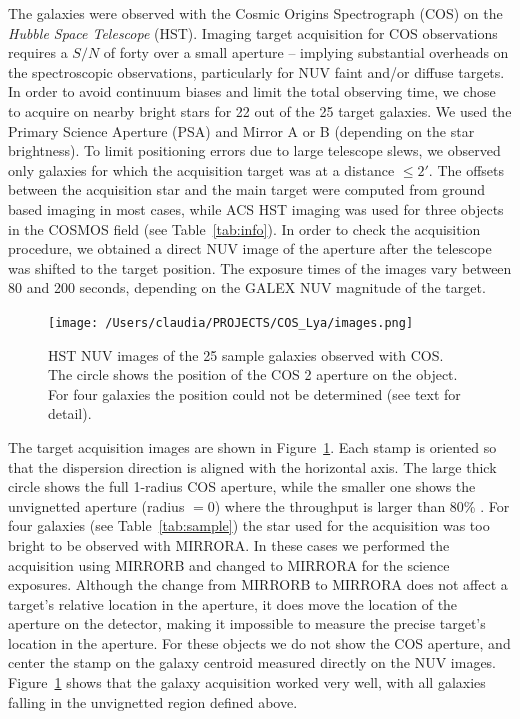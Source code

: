 \documentclass[manuscript]{emulateapj}
\begin{document}
The galaxies were observed  with the  Cosmic Origins Spectrograph (COS) on 
the {\it Hubble Space Telescope} (HST).  Imaging target acquisition for COS observations requires a 
$S/N$ of forty over a small aperture -- implying substantial overheads on the spectroscopic observations, 
particularly for NUV faint and/or diffuse targets.  
In order to avoid continuum biases and limit the total observing time, we chose to acquire on nearby bright stars for 22 out of the 25 target galaxies. We used the Primary Science Aperture (PSA)  and Mirror A or B (depending on the star brightness). 
To limit positioning errors due to large  telescope slews,  we observed only galaxies for which the acquisition target was at a distance $\le 2'$.  The offsets between the acquisition star and the main target were computed from  ground based imaging in most cases, while ACS HST imaging was used for three  objects in the
COSMOS field (see Table~\ref{tab:info}). In order to check the acquisition procedure, we obtained a 
direct NUV image of the aperture after the telescope was shifted to the target position.  
The exposure times of the images vary between 80 and 200 seconds, depending on the GALEX NUV
magnitude of the target.

\begin{figure}[t!]
  \centering
  \texttt{[image: /Users/claudia/PROJECTS/COS\_Lya/images.png]}
\caption{HST NUV images of the 25 sample galaxies observed with COS. The circle shows the
 position of the COS 2 aperture on the object. For four galaxies the
 position could not be determined (see text for detail).}
  \label{fig:images}
\end{figure}

The target acquisition images are shown in Figure~\ref{fig:images}. Each stamp is oriented so that the 
dispersion direction is aligned with the horizontal axis. The large thick circle shows the full 1-radius COS aperture, while the smaller one shows the unvignetted aperture (radius $=$0) where the throughput is larger than 80\% \citep{Goudfrooij2010}.  For four galaxies (see Table~\ref{tab:sample}) 
the star used for the acquisition was too bright to be observed with MIRRORA. In these cases
we performed the acquisition using MIRRORB and changed to MIRRORA for the
science exposures. Although the change from MIRRORB to MIRRORA does not
affect a target's relative location in the aperture, it does move the location of the aperture on the detector, making it impossible to measure the precise target's location in the aperture. For these objects we do not show the COS aperture, and center the stamp on the galaxy centroid measured directly on the NUV images.  
Figure~\ref{fig:images} shows that the galaxy acquisition worked very well, with all galaxies falling in the unvignetted region defined above.
\end{document}
